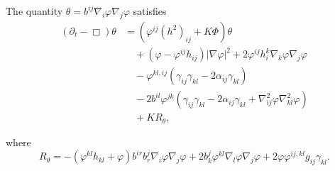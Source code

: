 \documentclass[12pt]{amsart}
\begin{document}
\begin{lemma}
\label{lem:Evtheta}
The quantity $\theta = b^{ij}\nabla_i \varphi\nabla_j\varphi$ satisfies
\[
\begin{split}
(\partial_{t} - \Box)\theta &= (\varphi^{ij}(h^2)_{ij} + K\Phi)\theta \\
&\quad + (\varphi - \varphi^{ij}h_{ij})|\nabla\varphi|^{2} + 2\varphi^{ij}h^{k}_{i}\nabla_k\varphi\nabla_j\varphi \\
&\quad - \varphi^{kl,ij} (\gamma_{ij}\gamma_{kl}  - 2\alpha_{ij} \gamma_{kl}) \\
&\quad - 2b^{il} \varphi^{jk} \left(\gamma_{ij} \gamma_{kl} - 2\alpha_{ij} \gamma_{kl} + \nabla^2_{ij}\varphi\nabla^2_{kl}\varphi\right) \\
&\quad + KR_{\theta},
\end{split}
\]
\end{lemma}
where
\[
R_{\theta} = -(\varphi^{kl}h_{kl} + \varphi)b^{ir}b^{j}_{r}\nabla_i \varphi\nabla_j\varphi + 2 b^{j}_{k}\varphi^{kl}\nabla_l\varphi\nabla_j\varphi + 2 \varphi\varphi^{ij,kl} g_{ij} \gamma_{kl}.
\]
\end{document}
